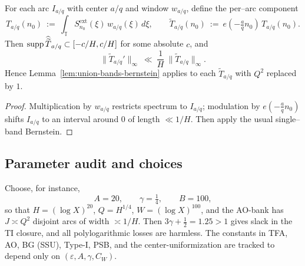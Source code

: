 \begin{lemma}\label{lem:per-arc-demod}
For each arc $I_{a/q}$ with center $a/q$ and window $w_{a/q}$, define the per–arc component
\[
T_{a/q}(n_0)\ :=\ \int_{\mathbb T} S^{\mathrm{ext}}_{n_0}(\xi)\,w_{a/q}(\xi)\,d\xi,
\qquad 
\widetilde T_{a/q}(n_0)\ :=\ e(-\tfrac{a}{q}n_0)\,T_{a/q}(n_0).
\]
Then $\operatorname{supp} \widehat{\widetilde T}_{a/q}\subset[-c/H,c/H]$ for some absolute $c$, and
\[
\|\widetilde T_{a/q}'\|_\infty\ \ll\ \frac{1}{H}\ \|\widetilde T_{a/q}\|_\infty.
\]
Hence Lemma~\ref{lem:union-bands-bernstein} applies to each $\widetilde T_{a/q}$ with $Q^2$ replaced by $1$.
\end{lemma}

\begin{proof}
Multiplication by $w_{a/q}$ restricts spectrum to $I_{a/q}$; modulation by $e(-\tfrac{a}{q}n_0)$ shifts $I_{a/q}$ to an interval around $0$ of length $\ll 1/H$. Then apply the usual single–band Bernstein.
\end{proof}


\subsection{Parameter audit and choices}
\label{subsec:param-audit}
Choose, for instance,
\[
A=20,\qquad \gamma=\tfrac14,\qquad B=100,
\]
so that $H=(\log X)^{20}$, $Q=H^{1/4}$, $W=(\log X)^{100}$, and the AO-bank has $J\asymp Q^2$ disjoint arcs of width $\asymp 1/H$. Then $3\gamma+\tfrac12=1.25>1$ gives slack in the TI closure, and all polylogarithmic losses are harmless. The constants in TFA, AO, BG (SSU), Type-I, PSB, and the center-uniformization are tracked to depend only on $(\varepsilon,A,\gamma,C_W)$.

